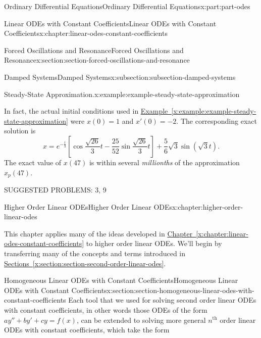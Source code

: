 \documentclass[oneside,10pt,]{book}
\newcommand{\xreffont}{\relax}
\numberwithin{equation}{part}
\begin{document}
\begin{partptx}{Ordinary Differential Equations}{}{Ordinary Differential Equations}{}{}{x:part:part-odes}
\begin{chapterptx}{Linear ODEs with Constant Coefficients}{}{Linear ODEs with Constant Coefficients}{}{}{x:chapter:linear-odes-constant-coefficients}
\begin{sectionptx}{Forced Oscillations and Resonance}{}{Forced Oscillations and Resonance}{}{}{x:section:section-forced-oscillations-and-resonance}
\begin{subsectionptx}{Damped Systems}{}{Damped Systems}{}{}{x:subsection:subsection-damped-systems}
\begin{example}{Steady-State Approximation.}{x:example:example-steady-state-approximation}
\end{example}
In fact, the actual initial conditions used in \hyperref[x:example:example-steady-state-approximation]{Example~{\xreffont\ref{x:example:example-steady-state-approximation}}} were \(x(0) = 1\) and \(x'(0) = -2\). The corresponding exact solution is%
\begin{equation*}
x = e^{-\frac{t}{3}}\left[\cos\frac{\sqrt{26}}{3}t - \frac{25}{52}\sin\frac{\sqrt{26}}{3}t\right] + \frac{5}{6}\sqrt{3}\sin(\sqrt{3}t).
\end{equation*}
The exact value of \(x(47)\) is within several \emph{millionths} of the approximation \(x_{p}(47)\).%
\end{subsectionptx}
\begin{conclusion}{}%
SUGGESTED PROBLEMS: 3, 9%
\end{conclusion}%
\end{sectionptx}
\end{chapterptx}
%
\typeout{************************************************}
\typeout{************************************************}
%
\begin{chapterptx}{Higher Order Linear ODEs}{}{Higher Order Linear ODEs}{}{}{x:chapter:higher-order-linear-odes}
\begin{introduction}{}%
This chapter applies many of the ideas developed in \hyperref[x:chapter:linear-odes-constant-coefficients]{Chapter~{\xreffont\ref{x:chapter:linear-odes-constant-coefficients}}} to higher order linear ODEs. We'll begin by transferring many of the concepts and terms introduced in \hyperref[x:section:section-second-order-linear-odes]{Sections~{\xreffont\ref{x:section:section-second-order-linear-odes}}\textendash{}{\xreffont\ref{x:section:section-homogeneous-odes-with-constant-coefficients}}}.%
\end{introduction}%
%
%
\typeout{************************************************}
\typeout{************************************************}
%
\begin{sectionptx}{Homogeneous Linear ODEs with Constant Coefficients}{}{Homogeneous Linear ODEs with Constant Coefficients}{}{}{x:section:section-homogeneous-linear-odes-with-constant-coefficients}
Each tool that we used for solving second order linear ODEs with constant coefficients, in other words those ODEs of the form \(ay''+by'+cy=f(x)\), can be extended to solving more general \(n^{\text{th}}\) order linear ODEs with constant coefficients, which take the form%

\end{sectionptx}
\end{chapterptx}
\end{partptx}
\end{document}
